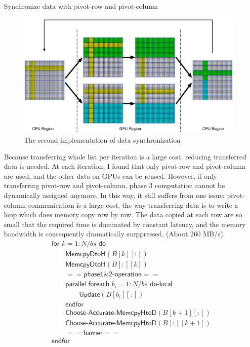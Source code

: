 \documentclass[12pt]{article}
\makeatletter
\renewenvironment{itemize}
{\list{$\bullet$}{\leftmargin\z@ \labelwidth\z@ \itemindent-\leftmargin
\let\makelabel\descriptionlabel}}
{\endlist}
\makeatother
\begin{document}
\begin{itemize}
    \item Synchronize data with pivot-row and pivot-column
    \begin{figure}[ht]
        \includegraphics[scale=.25]{./multiGPU_algo_diagram2.png}
        \caption{The second implementation of data synchronization}
    \end{figure}
    \begin{flushleft}
        Because transferring whole list per iteration is a large cost, reducing transferred data is needed. At each iteration, I found that only pivot-row and pivot-column are used, and the other data on GPUs can be reused. However, if only transferring pivot-row and pivot-column, phase 3 computation cannot be dynamically assigned anymore. In this way, it still suffers from one issue: pivot-column communication is a large cost, the way transferring data is to write a loop which does memory copy row by row. The data copied at each row are so small that the required time is dominated by constant latency, and the memory bandwidth is consequently dramatically surppressed, (About 260 MB/s).
        \begin{align*}
            &\mathsf{for} \,\, k = 1:N/bs \,\, \mathsf{do} \\
            &\quad \quad \mathsf{MemcpyDtoH} (B[k][:]) \\
            &\quad \quad \mathsf{MemcpyDtoH} (B[:][k]) \\
            &\quad \quad \mathsf{==phase1\&2\text{-}operation==} \\
            &\quad \quad \mathsf{parallel} \,\, \mathsf{foreach} \,\, b_i = 1:N/bs \,\, \mathsf{do\text{-}local} \\
            &\quad \quad \quad \quad \mathsf{Update} (B[b_i][:]) \\
            &\quad \quad \mathsf{endfor} \\
            &\quad \quad \mathsf{Choose\text{-}Accurate\text{-}MemcpyHtoD} (B[k+1][:]) \\
            &\quad \quad \mathsf{Choose\text{-}Accurate\text{-}MemcpyHtoD} (B[:][k+1]) \\
            &\quad \quad \mathsf{==barrier==} \\
            &\mathsf{endfor}
        \end{align*}
    \end{flushleft}


\end{itemize}
\end{document}
